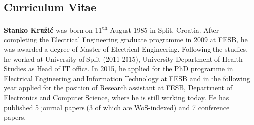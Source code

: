 

\newpage \mbox{} \newpage \pagestyle{empty}

\begin{flushleft}
\section*{Curriculum Vitae}

\vspace{15mm}

{\noindent\bf{Stanko Kružić}} was born on 11\textsuperscript{th} August 1985 in Split, Croatia. After completing the Electrical Engineering graduate programme in 2009 at FESB, he was awarded a degree of Master of Electrical Engineering. Following the studies, he worked at University of Split (2011-2015), University Department of Health Studies as Head of IT office. In 2015, he applied for the PhD programme in Electrical Engineering and Information Technology at FESB and in the following year applied for the position of Research assistant at FESB, Department of Electronics and Computer Science, where he is still working today. He has published 5 journal papers (3 of which are WoS-indexed) and 7 conference papers.


\end{flushleft}
\newpage \pagestyle{empty}






\newpage 